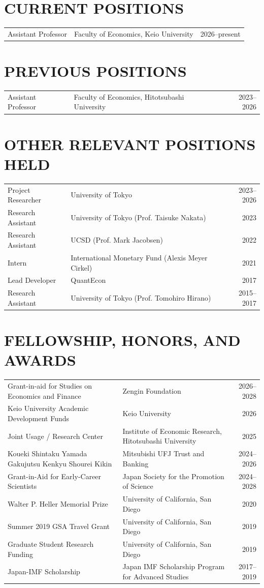 \documentclass[12pt]{article}
\begin{document}
\section*{CURRENT POSITIONS}
\begin{tabularx}{\linewidth}{@{}l Y R@{}}
Assistant Professor &Faculty of Economics, Keio University& 2026--present\\
\end{tabularx}

\section*{PREVIOUS POSITIONS}
\begin{tabularx}{\linewidth}{@{}l Y R@{}}
Assistant Professor &Faculty of Economics, Hitotsubashi University& 2023--2026\\
\end{tabularx}

\section*{OTHER RELEVANT POSITIONS HELD}
\begin{tabularx}{\linewidth}{@{}l Y R@{}}
Project Researcher &University of Tokyo& 2023--2026\\
Research Assistant &University of Tokyo (Prof. Taisuke Nakata)& 2023\\
Research Assistant &UCSD (Prof. Mark Jacobsen)& 2022\\
Intern &International Monetary Fund (Alexis Meyer Cirkel)& 2021\\
Lead Developer &QuantEcon& 2017\\
Research Assistant &University of Tokyo (Prof. Tomohiro Hirano)& 2015--2017
\end{tabularx}

\section*{FELLOWSHIP, HONORS, AND AWARDS}
\begin{tabularx}{\linewidth}{@{}H Y R@{}}
Grant-in-aid for Studies on Economics and Finance & Zengin Foundation & 2026--2028 \\
Keio University Academic Development Funds & Keio University & 2026 \\
Joint Usage / Research Center&Institute of Economic Research, Hitotsubashi University&2025\\
Koueki Shintaku Yamada Gakujutsu Kenkyu Shourei Kikin&Mitsubishi UFJ Trust and Banking&2024--2026\\
Grant-in-Aid for Early-Career Scientists&Japan Society for the Promotion of Science&2024--2028\\
Walter P. Heller Memorial Prize&University of California, San Diego&2020\\
Summer 2019 GSA Travel Grant&University of California, San Diego&2019\\
Graduate Student Research Funding&University of California, San Diego&2019\\
Japan-IMF Scholarship&Japan IMF Scholarship Program for Advanced Studies&2017--2019
\end{tabularx}
\end{document}
